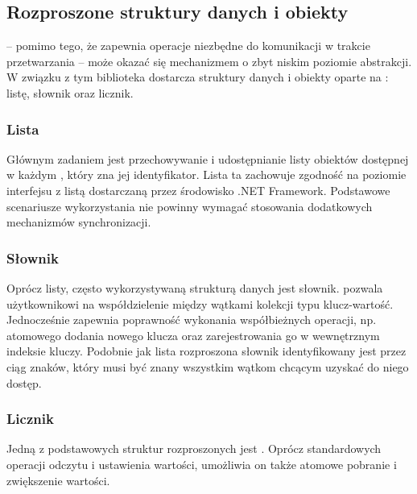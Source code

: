 \subsection{Rozproszone struktury danych i obiekty}

\label{sub:----Koncepcja-wspoldzielone-struktury-danych}
-- pomimo tego, że zapewnia operacje niezbędne do komunikacji w trakcie
przetwarzania -- może okazać się mechanizmem o zbyt niskim poziomie
abstrakcji. W związku z tym biblioteka dostarcza struktury danych
i obiekty oparte na : listę, słownik
oraz licznik.


\subsubsection*{Lista}

Głównym zadaniem  jest przechowywanie
i udostępnianie listy obiektów dostępnej w każdym ,
który zna jej identyfikator. Lista ta zachowuje zgodność na poziomie
interfejsu z listą dostarczaną przez środowisko .NET Framework. Podstawowe
scenariusze wykorzystania  nie powinny
wymagać stosowania dodatkowych mechanizmów synchronizacji.


\subsubsection*{Słownik}

Oprócz listy, często wykorzystywaną strukturą danych jest słownik.
 pozwala użytkownikowi na współdzielenie
między wątkami kolekcji typu klucz-wartość. Jednocześnie zapewnia
poprawność wykonania współbieżnych operacji, np. atomowego dodania
nowego klucza oraz zarejestrowania go w wewnętrznym indeksie kluczy.
Podobnie jak lista rozproszona słownik identyfikowany jest przez ciąg
znaków, który musi być znany wszystkim wątkom chcącym uzyskać do niego
dostęp.


\subsubsection*{Licznik}

\label{par:koncepcja-distributed-counter}Jedną z podstawowych struktur
rozproszonych jest . Oprócz standardowych
operacji odczytu i ustawienia wartości, umożliwia on także atomowe
pobranie i zwiększenie wartości. 

